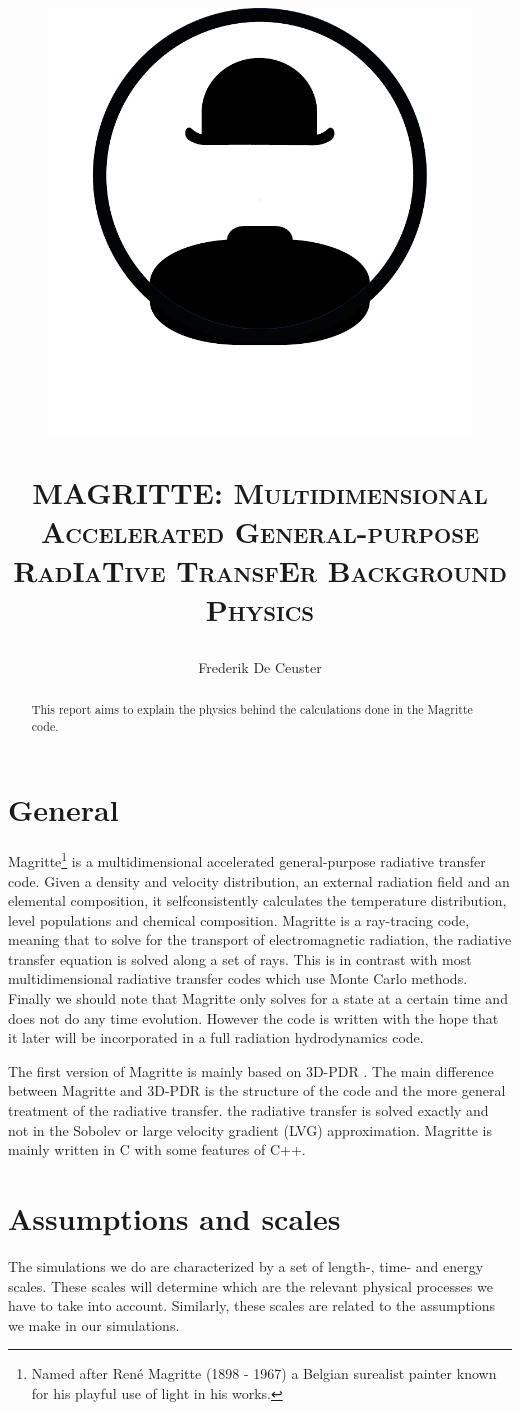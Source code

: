 \documentclass[]{article}
\title{
  \begin{figure}[H]
	   \centering
	   \includegraphics[scale=.3]{Images/Magritte_logo_v2_BW.pdf}
  \end{figure}
  \vskip-3mm
  \textsc{\Large MAGRITTE: Multidimensional Accelerated General-purpose RadIaTive TransfEr}
  \vskip13mm
  \textsc{\Huge Background Physics}
  \vskip13mm
}
\author{\Large Frederik De Ceuster}
\date{}
\begin{document}
\maketitle

\vskip13mm

\begin{abstract}
This report aims to explain the physics behind the calculations done in the Magritte code.
\end{abstract}

\newpage

\tableofcontents

\newpage


\section{General}

Magritte\footnote{Named after Ren\'e Magritte (1898 - 1967) a Belgian surealist painter known for his playful use of light in his works. } is a multidimensional accelerated general-purpose radiative transfer code. Given a density and velocity distribution, an external radiation field and an elemental composition, it selfconsistently calculates the temperature distribution, level populations and chemical composition. Magritte is a ray-tracing code, meaning that to solve for the transport of electromagnetic radiation, the radiative transfer equation is solved along a set of rays. This is in contrast with most multidimensional radiative transfer codes which use Monte Carlo methods. Finally we should note that Magritte only solves for a state at a certain time and does not do any time evolution. However the code is written with the hope that it later will be incorporated in a full radiation hydrodynamics code.

\bigskip

The first version of Magritte is mainly based on 3D-PDR \cite{3DPDR}. The main difference between Magritte and 3D-PDR is the structure of the code and the more general treatment of the radiative transfer.  the radiative transfer is solved exactly and not in the Sobolev or large velocity gradient (LVG) approximation.
Magritte is mainly written in C with some features of C++.


\section{Assumptions and scales}


The simulations we do are characterized by a set of length-, time- and energy scales. These scales will determine which are the relevant physical processes we have to take into account. Similarly, these scales are related to the assumptions we make in our simulations.
\end{document}
